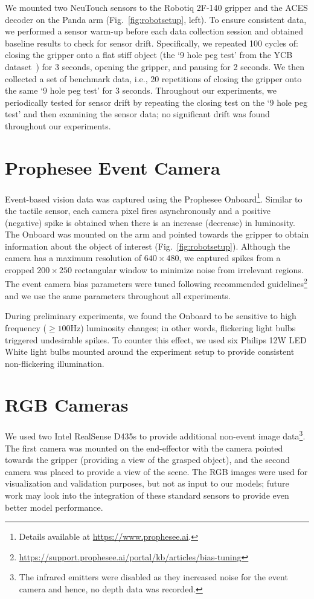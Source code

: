 \documentclass[fyp]{socreport}
\begin{document}
We mounted two NeuTouch sensors to the Robotiq 2F-140 gripper and the ACES
decoder on the Panda arm (Fig.~\ref{fig:robotsetup}, left). To ensure consistent
data, we performed a sensor warm-up before each data collection session and
obtained baseline results to check for sensor drift. Specifically, we repeated
100 cycles of: closing the gripper onto a flat stiff object (the `9 hole peg
test' from the YCB dataset~\cite{ycb2015}) for 3 seconds, opening the gripper,
and pausing for 2 seconds. We then collected a set of benchmark data, i.e., 20
repetitions of closing the gripper onto the same `9 hole peg test' for 3
seconds. Throughout our experiments, we periodically tested for sensor drift by
repeating the closing test on the `9 hole peg test' and then examining the
sensor data; no significant drift was found throughout our experiments.

\section{Prophesee Event Camera}
Event-based vision data was captured using the Prophesee
Onboard\footnote{Details available at \url{https://www.prophesee.ai}.}. Similar
to the tactile sensor, each camera pixel fires asynchronously and a positive
(negative) spike is obtained when there is an increase (decrease) in luminosity.
The Onboard was mounted on the arm and pointed towards the gripper to obtain
information about the object of interest (Fig.~\ref{fig:robotsetup}). Although
the camera has a maximum resolution of $640 \times 480$, we captured spikes from
a cropped $200 \times 250$ rectangular window to minimize noise from irrelevant
regions. The event camera bias parameters were tuned following recommended
guidelines\footnote{\url{https://support.prophesee.ai/portal/kb/articles/bias-tuning}}
and we use the same parameters throughout all experiments.

During preliminary experiments, we found the Onboard to be sensitive to high
frequency ($\geq 100$Hz) luminosity changes; in other words, flickering light
bulbs triggered undesirable spikes. To counter this effect, we used six Philips
12W LED White light bulbs mounted around the experiment setup to provide
consistent non-flickering illumination.

\section{RGB Cameras}
We used two Intel RealSense D435s to provide additional non-event image
data\footnote{The infrared emitters were disabled as they increased noise for
  the event camera and hence, no depth data was recorded.}. The first camera was
mounted on the end-effector with the camera pointed towards the gripper
(providing a view of the grasped object), and the second camera was placed to
provide a view of the scene. The RGB images were used for visualization and
validation purposes, but not as input to our models; future work may look into
the integration of these standard sensors to provide even better model
performance.
\end{document}
